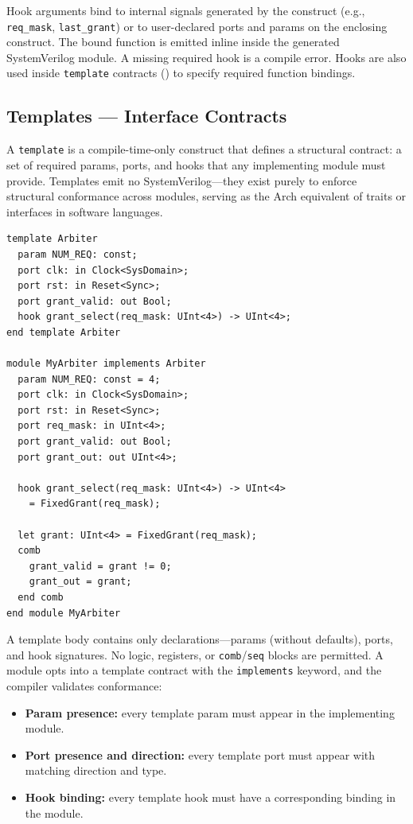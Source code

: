 \documentclass[11pt,twocolumn]{article}
\begin{document}
Hook arguments bind to internal signals generated by the construct (e.g., \texttt{req\_mask}, \texttt{last\_grant}) or to user-declared ports and params on the enclosing construct. The bound function is emitted inline inside the generated SystemVerilog module. A missing required hook is a compile error. Hooks are also used inside \texttt{template} contracts () to specify required function bindings.

\subsection{Templates --- Interface Contracts}\label{sec:templates}

A \texttt{template} is a compile-time-only construct that defines a structural contract: a set of required params, ports, and hooks that any implementing module must provide. Templates emit no SystemVerilog---they exist purely to enforce structural conformance across modules, serving as the Arch equivalent of traits or interfaces in software languages.

\begin{lstlisting}[language=Arch,caption={Template declaration and implementation},label={lst:template}]
template Arbiter
  param NUM_REQ: const;
  port clk: in Clock<SysDomain>;
  port rst: in Reset<Sync>;
  port grant_valid: out Bool;
  hook grant_select(req_mask: UInt<4>) -> UInt<4>;
end template Arbiter

module MyArbiter implements Arbiter
  param NUM_REQ: const = 4;
  port clk: in Clock<SysDomain>;
  port rst: in Reset<Sync>;
  port req_mask: in UInt<4>;
  port grant_valid: out Bool;
  port grant_out: out UInt<4>;

  hook grant_select(req_mask: UInt<4>) -> UInt<4>
    = FixedGrant(req_mask);

  let grant: UInt<4> = FixedGrant(req_mask);
  comb
    grant_valid = grant != 0;
    grant_out = grant;
  end comb
end module MyArbiter
\end{lstlisting}

A template body contains only declarations---params (without defaults), ports, and hook signatures. No logic, registers, or \texttt{comb}/\texttt{seq} blocks are permitted. A module opts into a template contract with the \texttt{implements} keyword, and the compiler validates conformance:

\begin{itemize}
\item \textbf{Param presence:} every template param must appear in the implementing module.
\item \textbf{Port presence and direction:} every template port must appear with matching direction and type.
\item \textbf{Hook binding:} every template hook must have a corresponding binding in the module.
\end{itemize}
\end{document}

